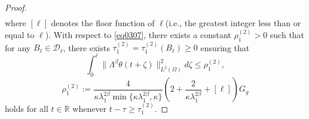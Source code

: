 \documentclass[10pt,a4paper]{amsart}
\begin{document}
\begin{proof}
\begin{equation}
\begin{aligned}
\end{aligned}
\end{equation}
where $[\ell]$ denotes the floor function of $\ell$(i.e., the greatest integer less than or equal to $\ell$).
With respect to \cref{eq0307}, there exists a constant $\rho_{1}^{(2)} > 0$ such that for any $B_{\ell} \in \mathcal{D}_{\ell}$, there exists $\tau_{1}^{(2)} = \tau_{1}^{(2)}(B_{\ell}) \geq 0$ ensuring that 
\begin{equation}\label{eq0316}
    \int_{0}^{\ell} \| \Lambda^\beta \theta(t+\zeta)\|_{L^2(\Omega)}^2 d\zeta
    \leq 
    \rho_{1}^{(2)},
\end{equation}
\[
   \rho_{1}^{(2)}
   :=
   \frac{4}{\kappa\lambda_{1}^{2\beta}\min\{\kappa\lambda_1^{2\beta},\kappa\}}
   \left(2+\frac{2}{\kappa\lambda_{1}^{2\beta}}+[\ell]\right)G_g
\]
holds for all $t \in \mathbb{R}$ whenever $t - \tau \geq \tau_{1}^{(2)}$.  


\end{proof}
\end{document}
